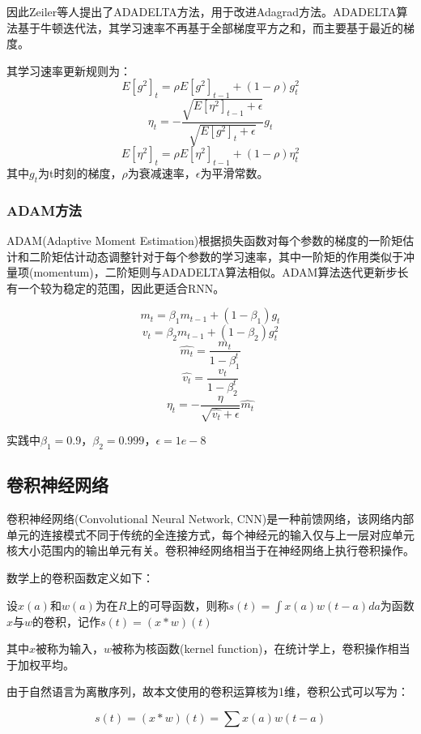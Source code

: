 因此Zeiler等人提出了ADADELTA方法，用于改进Adagrad方法。ADADELTA算法基于牛顿迭代法，其学习速率不再基于全部梯度平方之和，而主要基于最近的梯度。


其学习速率更新规则为：
\begin{equation}
E[g^2]_t = \rho E[g^2]_{t-1} + (1-\rho )g_t^2
\end{equation}
\begin{equation}
\eta_t =  -\frac{\sqrt{E[\eta^2]_{t-1} + \epsilon}}{\sqrt{E[g^2]_{t} + \epsilon}}g_t
\end{equation}
\begin{equation}
E[\eta^2]_t = \rho E[\eta^2]_{t-1} + (1-\rho )\eta_t^2
\end{equation}
其中$g_t$为t时刻的梯度，$\rho$为衰减速率，$\epsilon$为平滑常数。

\subsubsection{ADAM方法}
ADAM(Adaptive Moment Estimation)\cite{adam}根据损失函数对每个参数的梯度的一阶矩估计和二阶矩估计动态调整针对于每个参数的学习速率，其中一阶矩的作用类似于冲量项(momentum)，二阶矩则与ADADELTA算法相似。ADAM算法迭代更新步长有一个较为稳定的范围，因此更适合RNN。


\begin{equation}
m_t = \beta_1 m_{t - 1} + (1 - \beta_1)g_t
\end{equation}
\begin{equation}
v_t = \beta_2 m_{t - 1} + (1 - \beta_2)g_t^2
\end{equation}
\begin{equation}
\hat{m_t} = \frac{m_t}{1 - \beta_1^t}
\end{equation}
\begin{equation}
\hat{v_t} = \frac{v_t}{1 - \beta_2^t}
\end{equation}
\begin{equation}
\eta_t = -\frac{\eta}{\sqrt{\hat{v_t} + \epsilon}} \hat{m_t}
\end{equation}


实践中$\beta_1=0.9$，$\beta_2=0.999$，$\epsilon = 1e-8$

\subsection{卷积神经网络}
卷积神经网络(Convolutional Neural Network, CNN)是一种前馈网络，该网络内部单元的连接模式不同于传统的全连接方式，每个神经元的输入仅与上一层对应单元核大小范围内的输出单元有关。卷积神经网络相当于在神经网络上执行卷积操作。\par
数学上的卷积函数定义如下：\par
设$x(a)$和$w(a)$为在$R$上的可导函数，则称$s(t) = \int x(a)w(t-a)da$为函数$x$与$w$的卷积，记作$s(t) = (x * w)(t)$\par
其中$x$被称为输入，$w$被称为核函数(kernel function)，在统计学上，卷积操作相当于加权平均。\par
由于自然语言为离散序列，故本文使用的卷积运算核为1维，卷积公式可以写为：\par
\begin{equation}
s(t) = (x * w)(t) = \sum x(a)w(t -a)
\end{equation}


